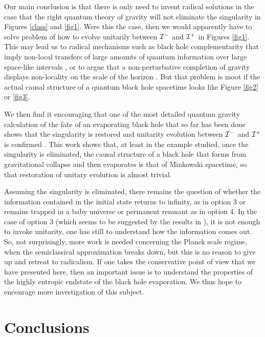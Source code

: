 \documentclass[12pt]{article}
\begin{document}
Our main conclusion is that there is only need to invent radical solutions in the case that  the right 
quantum theory of gravity will not eliminate the 
singularity in Figures \ref{class} and \ref{fig1}.  
Were this the  case, then we would  apparently have to solve  problem of how to evolve unitarily between 
 ${\cal I}^-$ and ${\cal I}^+$ in Figures  \ref{fig1}.  This may lead us to  radical mechanisms 
such as black hole complementarity that imply non-local transfers of large amounts of quantum information 
over large space-like intervals \cite{BHC}, or to argue that a non-perturbative completion of gravity 
displays non-locality on the scale of the horizon \cite{Giddings:2007ie}. But that 
problem is moot if the actual causal structure of a quantum black hole spacetime looks like  Figure \ref{fig2} or \ref{fig3}. 

We then find it encouraging that one of the most  detailed quantum gravity calculation of the fate of an evaporating black hole that so far has been done shows that the singularity is restored and unitarity evolution between ${\cal I}^-$ and ${\cal I}^+$ is confirmed \cite{Ashtekar:2008jd}. This work shows that, at least in the example studied, once the singularity is eliminated, the causal structure of a black hole that forms from gravitational collapse and then evaporates is that of Minkowski spacetime, so that restoration of unitary evolution is almost trivial. 

Assuming the singularity is eliminated, there remains the question of whether 
 the information contained in the initial state returns to infinity, as in option 3 or remains trapped in a baby universe or permanent
 remnant as in option 4.  In the case of option 3 (which seems to be suggested by the results in \cite{Ashtekar:2008jd}), it is not
 enough to invoke unitarity, 
 one has still to understand how the information comes out.  So, not surprisingly,  more work is needed concerning the Planck scale regime, when the semiclassical approximation breaks down, but this is 
no reason to give up and retreat to radicalism. If one takes the conservative 
point of view that we have presented here, then an important issue is to  understand the 
properties of the highly entropic endstate of the black hole evaporation. We thus hope to encourage more
investigation of this subject.

\section{Conclusions}
\label{conc}
\end{document}

